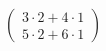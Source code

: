 \documentclass[preview]{standalone}
\begin{document}
\begin{align*}
\begin{pmatrix}3 \cdot 2 + 4 \cdot 1\\5 \cdot 2 + 6 \cdot 1\end{pmatrix}
\end{align*}
\end{document}
